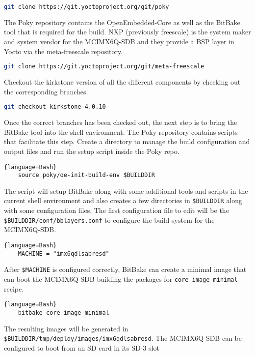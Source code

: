 \begin{lstlisting}[language=Bash]
	git clone https://git.yoctoproject.org/git/poky
\end{lstlisting}

The Poky repository contains the OpenEmbedded-Core as well as the BitBake tool that is required for the build. NXP (previously freescale) is the system maker and system vendor for the MCIMX6Q-SDB and they provide a BSP layer in Yocto via the meta-freescale repository.

\begin{lstlisting}[language=Bash]
	git clone https://git.yoctoproject.org/git/meta-freescale
\end{lstlisting}

Checkout the kirkstone version of all the different components by checking out the corresponding branches.

\begin{lstlisting}[language=Bash]
	git checkout kirkstone-4.0.10
\end{lstlisting}

Once the correct branches has been checked out, the next step is to bring the BitBake tool into the shell environment. The Poky repository contains scripts that facilitate this step. Create a directory to manage the build configuration and output files and run the setup script inside the Poky repo.

\begin{lstlisting}{language=Bash}
	source poky/oe-init-build-env $BUILDDIR
\end{lstlisting}

The script will setup BitBake along with some additional tools and scripts in the current shell environment and also creates a few directories in \texttt{\$BUILDDIR} along with some configuration files. The first configuration file to edit will be the \texttt{\$BUILDDIR/conf/bblayers.conf} to configure the build system for the MCIMX6Q-SDB.

\begin{lstlisting}{language=Bash}
	MACHINE = "imx6qdlsabresd"
\end{lstlisting}

After \texttt{\$MACHINE} is configured correctly, BitBake can create a minimal image that can boot the MCIMX6Q-SDB building the packages for \texttt{core-image-minimal} recipe.

\begin{lstlisting}{language=Bash}
	bitbake core-image-minimal
\end{lstlisting}

The resulting images will be generated in \texttt{\$BUILDDIR/tmp/deploy/images/imx6qdlsabresd}. The MCIMX6Q-SDB can be configured to boot from an SD card in its SD-3 slot

